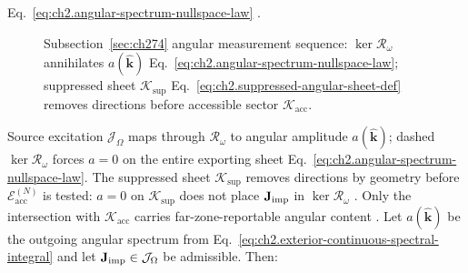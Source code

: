 Eq.~\eqref{eq:ch2.angular-spectrum-nullspace-law} \cite{harrington2001}.
\begin{figure}[t]
\centering
{}
\caption{Subsection~\ref{sec:ch274} angular measurement sequence: \(\ker\mathcal{R}_\omega\) annihilates \(a(\widehat{\mathbf{k}})\) Eq.~\eqref{eq:ch2.angular-spectrum-nullspace-law}; suppressed sheet
\(\mathcal{K}_{\mathrm{sup}}\) Eq.~\eqref{eq:ch2.suppressed-angular-sheet-def} removes directions
before accessible sector \(\mathcal{K}_{\mathrm{acc}}\).}
\label{fig:ch2.angular-spectrum-null-measurement chain}
\end{figure}
Source excitation $\mathcal{J}_\Omega$ maps through $\mathcal{R}_\omega$ to angular amplitude
$a(\widehat{\mathbf{k}})$; dashed $\ker\mathcal{R}_\omega$ forces $a=0$ on the entire exporting
sheet Eq.~\eqref{eq:ch2.angular-spectrum-nullspace-law}. The suppressed sheet
$\mathcal{K}_{\mathrm{sup}}$ removes directions by geometry before $\mathcal{E}_{\mathrm{acc}}^{(N)}$ is tested:
$a=0$ on $\mathcal{K}_{\mathrm{sup}}$ does not place $\mathbf{J}_{\mathrm{imp}}$ in $\ker\mathcal{R}_\omega$
\cite{stratton1941}. Only the intersection with $\mathcal{K}_{\mathrm{acc}}$ carries
far-zone-reportable angular content \cite{devaney2004}.
\label{thm:ch2.angular-spectrum-null-consequences}
Let \(a(\widehat{\mathbf{k}})\) be the outgoing angular spectrum from
Eq.~\eqref{eq:ch2.exterior-continuous-spectral-integral} and let
\(\mathbf{J}_{\mathrm{imp}}\in\mathcal{J}_\Omega\) be admissible. Then:
